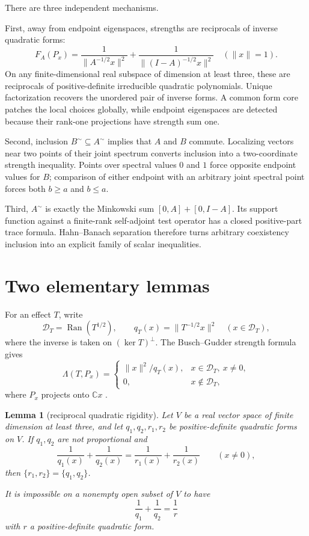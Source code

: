 \documentclass[11pt]{article}
\newtheorem{lemma}[theorem]{Lemma}
\newcommand{\Ran}{\operatorname{Ran}}
\newcommand{\coex}{\mathord{\sim}}
\begin{document}
There are three independent mechanisms.

First, away from endpoint eigenspaces, strengths are reciprocals of inverse quadratic forms:
\[
 F_A(P_x)=\frac1{\|A^{-1/2}x\|^2}
            +\frac1{\|(I-A)^{-1/2}x\|^2}
 \quad(\|x\|=1).
\]
On any finite-dimensional real subspace of dimension at least three, these are reciprocals of positive-definite irreducible quadratic polynomials.  Unique factorization recovers the unordered pair of inverse forms.  A common form core patches the local choices globally, while endpoint eigenspaces are detected because their rank-one projections have strength sum one.

Second, inclusion $B^{\coex}\subseteq A^{\coex}$ implies that $A$ and $B$ commute.  Localizing vectors near two points of their joint spectrum converts inclusion into a two-coordinate strength inequality.  Points over spectral values $0$ and $1$ force opposite endpoint values for $B$; comparison of either endpoint with an arbitrary joint spectral point forces both $b\ge a$ and $b\le a$.

Third, $A^{\coex}$ is exactly the Minkowski sum $[0,A]+[0,I-A]$.  Its support function against a finite-rank self-adjoint test operator has a closed positive-part trace formula.  Hahn--Banach separation therefore turns arbitrary coexistency inclusion into an explicit family of scalar inequalities.

\section{Two elementary lemmas}

For an effect $T$, write
\[
 \mathcal D_T=\Ran(T^{1/2}),\qquad
 q_T(x)=\|T^{-1/2}x\|^2\quad(x\in\mathcal D_T),
\]
where the inverse is taken on $(\ker T)^\perp$.  The Busch--Gudder strength formula gives
\begin{equation}\label{eq:strengthform}
 \Lambda(T,P_x)=
 \begin{cases}
  \|x\|^2/q_T(x),&x\in\mathcal D_T,\ x\ne0,\\
  0,&x\notin\mathcal D_T,
 \end{cases}
\end{equation}
where $P_x$ projects onto $\mathbb Cx$ \cite{BG,GS}.

\begin{lemma}[reciprocal quadratic rigidity]\label{lem:ufd}
Let $V$ be a real vector space of finite dimension at least three, and let $q_1,q_2,r_1,r_2$ be positive-definite quadratic forms on $V$.  If $q_1,q_2$ are not proportional and
\[
 \frac1{q_1(x)}+\frac1{q_2(x)}
 =\frac1{r_1(x)}+\frac1{r_2(x)}\qquad(x\ne0),
\]
then $\{r_1,r_2\}=\{q_1,q_2\}$.

It is impossible on a nonempty open subset of $V$ to have
\[
 \frac1{q_1}+\frac1{q_2}=\frac1r
\]
with $r$ a positive-definite quadratic form.
\end{lemma}
\end{document}
